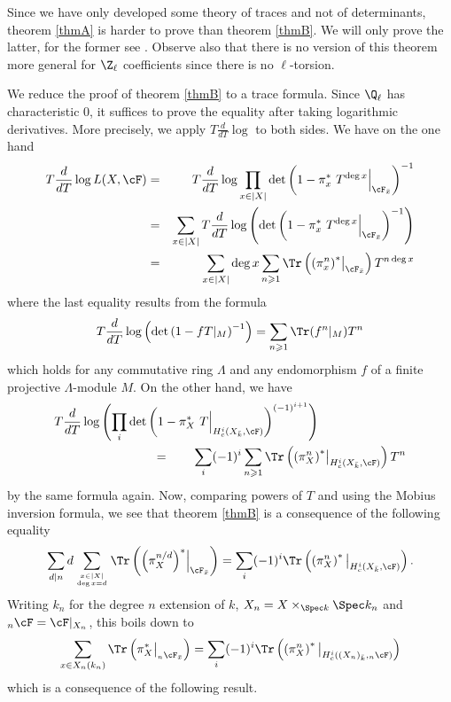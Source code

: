 \begin{remark}
Since we have only developed some theory of traces and not of determinants, theorem \ref{thmA} is harder to prove than theorem \ref{thmB}. We will only prove the latter, for the former see \cite{SGA4.5}. Observe also that there is no version of this theorem more general for $\Z_\ell$ coefficients since there is no $\ell$-torsion.
\end{remark}

We reduce the proof of theorem \ref{thmB} to a trace formula. Since $\Q_\ell$ has characteristic 0, it suffices to prove the equality after taking logarithmic derivatives. More precisely, we apply $T\frac{d}{dT} \log $ to both sides. We have on the one hand
\begin{eqnarray*}
T\frac{d}{dT}\log L(X, \cF) & = & 
T\frac{d}{dT} \log \prod_{x\in |X|} \det\left(1-\pi_x^*\ T^{\deg x}\Big|_{\cF_{\bar x}}\right)^{-1}\\
& = & \sum_{x\in |X|} T\frac{d}{dT} \log \left( \det\left(1-\pi_x^*\ T^{\deg x}\Big|_{\cF_{\bar x}}\right)^{-1}\right) \\
&= & \sum_{x \in |X|} \deg x\sum_{n \geqslant 1} \Tr\left({\left(\pi_x^n\right)}^*\big|_{\cF_{\bar x}}\right) T^{n\deg x}
\end{eqnarray*}
where the last equality results from the formula
$$
T\frac{d}{dT}\log\left(\det\left(1-fT|_M\right)^{-1}\right) = \sum_{n\geqslant 1} \Tr(f^n|_M)T^n
$$
which holds for any commutative ring $\Lambda$ and any endomorphism $f$ of a finite projective $\Lambda$-module $M$. On the other hand, we have
\begin{align*}
&T\frac{d}{dT} \log\left(\prod_i \det\left(1-\pi_X^*\ T\Big|_{H_c^i\left(X_{\bar k} , \cF\right)}\right)^{(-1)^{i+1}}\right) \\
&\qquad\qquad\qquad \qquad = \qquad
\sum_i (-1)^i \sum_{n\geqslant 1} \Tr\left({\left(\pi_X^n\right)}^*\big|_{H_c^i(X_{\bar k}, \cF)}\right) T^n
\end{align*}
by the same formula again. Now, comparing powers of $T$ and using the Mobius inversion formula, we see that theorem \ref{thmB} is a consequence of the following equality
$$
\sum_{d | n} d \sum_{x\in |X| \atop \deg x = d} \Tr \left( {\left( \pi_X^{n/d} \right)}^* \Big|_{\cF_{\bar x}} \right)
=
\sum_i (-1)^i \Tr\left(\left(\pi^n_X\right)^*\big|_{H^i_c(X_{\bar k}, \cF)} \right).
$$
Writing $k_n$ for the degree $n$ extension of $k$, $X_n = X \times_{\Spec k} \Spec k_n$ and $_n \cF = \cF|_{X_n}$, this boils down to
$$
\sum_{x \in X_n(k_n)} \Tr\left( \pi_X^*\big|_{_n\cF_{\bar x}} \right)
=
\sum_i (-1)^i \Tr\left(\left(\pi^n_X\right)^*\big|_{H^i_c({(X_n)}_{\bar k}, _n\cF)} \right)
$$
which is a consequence of the following result.

